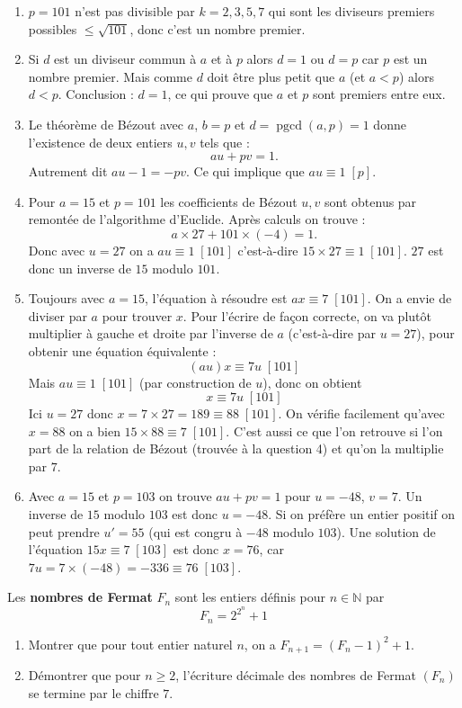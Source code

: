 \documentclass[11pt,class=report,crop=false]{standalone}
\newcommand{\pgcd}{\mathop{\mathrm{pgcd}}\nolimits}
\begin{document}
\correction
\sauteligne
\begin{enumerate}
    \item $p=101$ n'est pas divisible par $k=2,3,5,7$ qui sont les diviseurs premiers possibles $\le \sqrt{101}$, donc c'est un nombre premier.
    \item Si $d$ est un diviseur commun à $a$ et à $p$ alors $d=1$ ou $d=p$ car $p$ est un nombre premier. Mais comme $d$ doit être plus petit que $a$ (et $a < p$) alors $d<p$. Conclusion : $d=1$, ce qui prouve que $a$ et $p$ sont premiers entre eux.
    \item Le théorème de Bézout avec $a$, $b=p$ et $d=\pgcd(a,p)=1$ donne l'existence de deux entiers $u,v$ tels que :
    $$au+pv = 1.$$
    Autrement dit $au - 1 = -pv$. Ce qui implique que $au \equiv 1 \; [p]$.
    \item Pour $a=15$ et $p=101$ les coefficients de Bézout $u,v$ sont obtenus par remontée de l'algorithme d'Euclide. Après calculs on trouve :
    $$a \times 27 + 101\times (-4) = 1.$$
    Donc avec $u=27$ on a $au \equiv 1 \; [101]$ c'est-à-dire $15 \times 27 \equiv 1 \; [101]$. $27$ est donc un inverse de $15$ modulo $101$.
    \item Toujours avec $a=15$, l'équation à résoudre est $ax \equiv 7 \; [101]$. On a envie de diviser par $a$ pour trouver $x$. Pour l'écrire de façon correcte, on va plutôt multiplier à gauche et droite par l'inverse de $a$ (c'est-à-dire par $u=27$), pour obtenir une équation équivalente :
    $$(au)x \equiv 7u \; [101]$$ 
    Mais $au \equiv 1 \; [101]$ (par construction de $u$), donc on obtient 
    $$x \equiv 7u \; [101]$$
    Ici $u=27$ donc $x = 7 \times 27 = 189 \equiv 88 \; [101]$.
    On vérifie facilement qu'avec $x=88$ on a bien $15 \times 88 \equiv 7 \; [101]$. C'est aussi ce que l'on retrouve si l'on part de la relation de Bézout (trouvée à la question 4) et qu'on la multiplie par $7$.
    
    \item Avec $a=15$ et $p=103$ on trouve $au+pv=1$ pour $u=-48$, $v=7$.
    Un inverse de $15$ modulo $103$ est donc $u = -48$. Si on préfère un entier positif on peut prendre $u'=55$ (qui est congru à $-48$ modulo $103$).
    Une solution de l'équation $15x\equiv 7 \; [103]$ est donc $x=76$, car 
    $7u = 7 \times (-48) = -336 \equiv 76 \; [103]$. 
    
\end{enumerate}
\fincorrection
\finexercice


\exercice{}
\enonce
Les \textbf{nombres de Fermat} $F_n$ sont les entiers définis pour $n \in \mathbb{N}$ par 
$$ F_n = 2^{2^n} + 1 $$
\begin{enumerate}
\item Montrer que pour tout entier naturel $n$, on a $F_{n+1} = (F_n - 1)^2 + 1$.
\item Démontrer que pour $n \geq 2$, l'écriture décimale des nombres de Fermat $(F_n)$ se termine par le chiffre $7$.
\end{enumerate}
\finenonce
\end{document}
